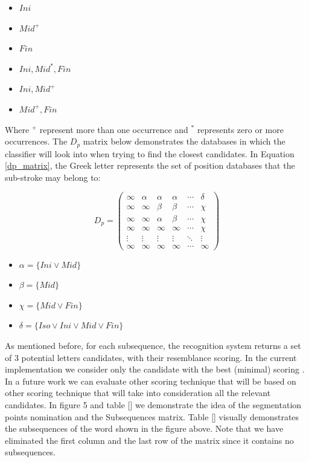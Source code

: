 \documentclass[journal,compsoc]{IEEEtran}
\begin{document}
\begin{multicols}{2}
\begin{itemize}
    \item $Ini$
    \item $Mid^{+}$
    \item $Fin$
    \item $Ini,Mid^{*},Fin$
    \item $Ini,Mid^{+}$
    \item $Mid^{+},Fin$
\end{itemize}
\end{multicols}
Where $^+$ represent more than one occurrence and $^*$ represents zero or more occurrences. The $D_p$ matrix below demonstrates the databases in which the classifier will look into when trying to find the closest candidates. In Equation \ref{dp_matrix}, the Greek letter represents the set of position databases that the sub-stroke may belong to:

\begin{equation}
D_{p}=
\left( \begin{array}{cccccc}
\infty & \alpha & \alpha & \alpha & \cdots & \delta \\
\infty & \infty & \beta & \beta & \cdots & \chi \\
\infty & \infty & \alpha & \beta & \cdots & \chi \\
\infty & \infty & \infty & \infty & \cdots & \chi \\
\vdots & \vdots & \vdots & \vdots & \ddots & \vdots \\
\infty & \infty & \infty & \infty & \cdots & \infty \end{array} \right)
\label{dp_matrix}
\end{equation}

\setlength\multicolsep{1pt}
\begin{multicols}{2}
\begin{itemize}
    \item[] $\alpha=\{Ini \vee Mid\}$
    \item[] $\beta=\{Mid\}$
    \item[] $\chi=\{Mid \vee Fin\}$
    \item[] $\delta=\{Iso \vee Ini \vee Mid \vee Fin\}$
\end{itemize}
\end{multicols}

As mentioned before, for each subsequence, the recognition system returns a set of 3 potential letters candidates, with their resemblance scoring. In the current implementation we consider only the candidate with the best (minimal) scoring . In a future work we can evaluate other scoring technique that will be based on other scoring technique that will take into consideration all the relevant candidates.
In figure 5 and table [] we demonstrate the idea of the segmentation points nomination and the Subsequences matrix.
Table [] visually demonstrates the subsequences of the word shown in the figure above. Note that we have eliminated the first column and the last row of the matrix since it contains no subsequences.
\end{document}
